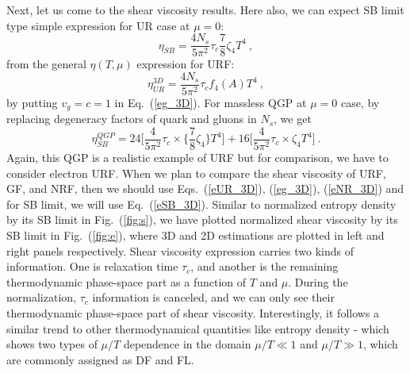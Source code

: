 \documentclass[amsmath,amssymb,aps,prb]{revtex4-2}
\newcommand{\be}{\begin{equation}}
\newcommand{\ee}{\end{equation}}
\begin{document}
    Next, let us come to the shear viscosity results. Here also, we can expect SB limit type simple expression for UR case at $\mu=0$:
    \be 
    \eta_{SB} = \frac{4 N_s }{5 \pi^2} \tau_c \frac{7}{8}\zeta_4 T^4~,
    \label{eSB_3D}
    \ee 
    from the general $\eta(T,\mu)$ expression for URF:
    \be 
    \eta_{UR}^{3D} = \frac{4 N_s }{5 \pi^2} \tau_c f_4\left(A\right) T^4~,
   \label{eUR_3D}
    \ee 
    by putting $v_g=c=1$ in Eq.~(\ref{eg_3D}).
    For massless QGP at $\mu=0$ case, by replacing degeneracy factors of quark and gluons in $N_s$, we get 
    \be 
    \eta^{QGP}_{SB} = 24\Big[\frac{4}{5\pi^2 } \tau_c\times \Big\{\frac{7}{8}\zeta_4\Big\}T^4 \Big]+16\Big[\frac{ 4}{5\pi^2 } \tau_c\times \zeta_4 T^4 \Big]~.
    \ee
    Again, this QGP is a realistic example of URF but for comparison, we have to consider electron URF. When we plan to compare the shear viscosity of URF, GF, and NRF, then we should use Eqs.~(\ref{eUR_3D}), (\ref{eg_3D}), (\ref{eNR_3D}) and for SB limit, we will use Eq.~(\ref{eSB_3D}). Similar to normalized entropy density by its SB limit in Fig.~(\ref{fig:s}), we have plotted normalized shear viscosity by its SB limit in Fig.~(\ref{fig:e}), where 3D and 2D estimations are plotted in left and right panels respectively. Shear viscosity expression carries two kinds of information. One is relaxation time $\tau_c$, and another is the remaining thermodynamic phase-space part as a function of $T$ and $\mu$. During the normalization, $\tau_c$ information is canceled, and we can only see their thermodynamic phase-space part of shear viscosity. Interestingly, it follows a similar trend to other thermodynamical quantities like entropy density - which shows two types of $\mu/T$ dependence in the domain $\mu/T\ll 1$ and $\mu/T\gg 1$, which are commonly assigned as DF and FL.


\end{document}
